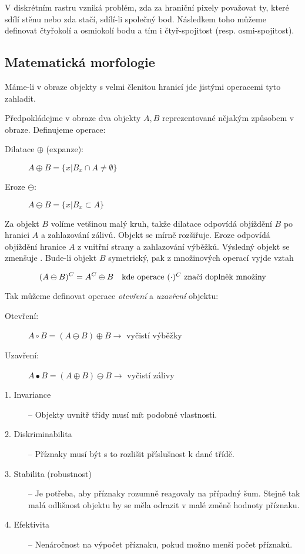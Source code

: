 V diskrétním rastru vzniká problém, zda za hraniční pixely považovat ty, které sdílí stěnu nebo zda stačí, sdílí-li 
společný bod. Následkem toho můžeme definovat čtyřokolí a osmiokolí bodu a tím i čtyř-spojitost (resp. osmi-spojitost).


\subsection{Matematická morfologie}
Máme-li v obraze objekty s velmi členitou hranicí jde jistými operacemi tyto  zahladit.

Předpokládejme v obraze dva objekty $A,B$ reprezentované nějakým způsobem v obraze. Definujeme operace:
\begin{description}
\item[Dilatace $\oplus$ (expanze):] $A\oplus B=\{x|B_x\cap A\neq \emptyset\}$
\item[Eroze $\ominus$:] $A\ominus B=\{x|B_x\subset A\}$
\end{description}

Za objekt $B$ volíme vetšinou malý kruh, takže dilatace odpovídá objíždění $B$  po hranici $A$ a zahlazování zálivů.
Objekt se mírně rozšiřuje. Eroze odpovídá objíždění hranice $A$ z vnitřní strany a zahlazování výběžků. Výsledný objekt
se zmenšuje .
Bude-li objekt $B$ symetrický, pak z množinových operací vyjde vztah

\begin{equation}
(A\ominus B)^C=A^C\oplus B\quad\hbox{kde operace $(\cdot)^C$ značí doplněk množiny}
\end{equation}

Tak můžeme definovat operace {\em otevření} a {\em uzavření} objektu:
\begin{description}
\item[Otevření:] $A\circ B=(A\ominus B)\oplus B$\quad$\rightarrow$ vyčistí výběžky
\item[Uzavření:] $A\bullet B=(A\oplus B)\ominus B$\quad$\rightarrow$ vyčistí zálivy
\end{description}

\begin{description}
\item[1. Invariance] -- Objekty uvnitř třídy musí mít podobné vlastnosti.
\item[2. Diskriminabilita] -- Příznaky musí být s to rozlišit příslušnost k dané třídě.
\item[3. Stabilita (robustnost)] -- Je potřeba, aby příznaky rozumně reagovaly na případný šum. Stejně tak malá odlišnost
objektu by se měla odrazit v malé změně hodnoty příznaku.
\item[4. Efektivita] -- Nenáročnost na výpočet příznaku, pokud možno menší počet příznaků.
\end{description}

